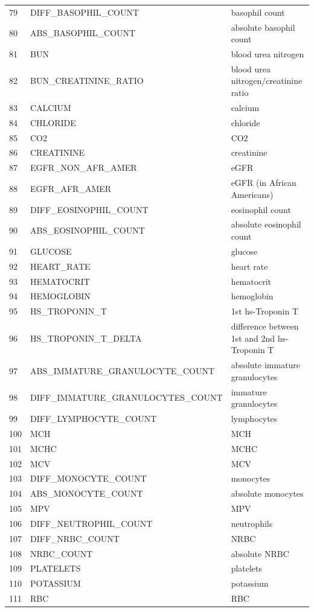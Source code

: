 \begin{longtable}{@{\extracolsep{\fill}}lll}
79 & DIFF\_BASOPHIL\_COUNT & basophil count \\
80 & ABS\_BASOPHIL\_COUNT & absolute basophil count \\
81 & BUN & blood urea nitrogen \\
82 & BUN\_CREATININE\_RATIO & blood urea nitrogen/creatinine ratio \\
83 & CALCIUM & calcium \\
84 & CHLORIDE & chloride \\
85 & CO2 & CO2 \\
86 & CREATININE & creatinine \\
87 & EGFR\_NON\_AFR\_AMER & eGFR \\
88 & EGFR\_AFR\_AMER & eGFR (in African Americans) \\
89 & DIFF\_EOSINOPHIL\_COUNT & eosinophil count \\
90 & ABS\_EOSINOPHIL\_COUNT & absolute eosinophil count \\
91 & GLUCOSE & glucose \\
92 & HEART\_RATE & heart rate \\
93 & HEMATOCRIT & hematocrit \\
94 & HEMOGLOBIN & hemoglobin \\
95 & HS\_TROPONIN\_T & 1st hs-Troponin T \\
96 & HS\_TROPONIN\_T\_DELTA & difference between 1st and 2nd hs-Troponin T \\
97 & ABS\_IMMATURE\_GRANULOCYTE\_COUNT & absolute immature granulocytes \\
98 & DIFF\_IMMATURE\_GRANULOCYTES\_COUNT & immature granulocytes \\
99 & DIFF\_LYMPHOCYTE\_COUNT & lymphocytes \\
100 & MCH & MCH \\
101 & MCHC & MCHC \\
102 & MCV & MCV \\
103 & DIFF\_MONOCYTE\_COUNT & monocytes \\
104 & ABS\_MONOCYTE\_COUNT & absolute monocytes \\
105 & MPV & MPV \\
106 & DIFF\_NEUTROPHIL\_COUNT & neutrophils \\
107 & DIFF\_NRBC\_COUNT & NRBC \\
108 & NRBC\_COUNT & absolute NRBC \\
109 & PLATELETS & platelets \\
110 & POTASSIUM & potassium \\
111 & RBC & RBC \\

\end{longtable}
